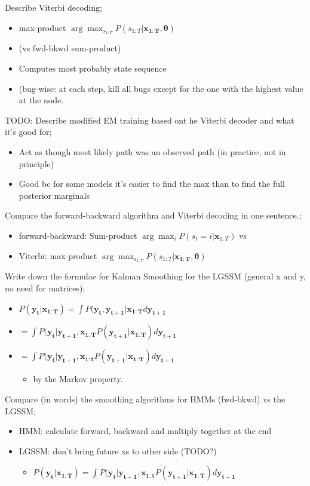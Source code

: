 \documentclass{article}
\begin{document}
Describe Viterbi decoding; \begin{itemize} \item max-product $\arg\max_{s_{1:T}}P(s_{1:T}|\mathbf{x_{1:T},\theta})$  \item (vs fwd-bkwd sum-product) \item Computes most probably state sequence \item (bug-wise: at each step, kill all bugs except for the one with the highest value at the node. \end{itemize}

TODO: Describe modified EM training based ont he Viterbi decoder and what it's good for; \begin{itemize} \item Act as though most likely path was an observed path (in practice, not in principle) \item Good bc for some models it's easier to find the max than to find the full posterior marginals \end{itemize}

Compare the forward-backward algorithm and Viterbi decoding in one sentence.; \begin{itemize} \item forward-backward: Sum-product $\arg\max_{i}P(s_t=i|\mathbf{x}_{1:T})$ vs \item Viterbi: max-product $\arg\max_{s_{1:T}}P(s_{1:T}|\mathbf{x_{1:T},\theta})$ \end{itemize}

Write down the formulae for Kalman Smoothing for the LGSSM (general x and y, no need for matrices); \begin{itemize} \item $P(\mathbf{y_t|x_{1:T}})=\int P(\mathbf{y_t, y_{t+1}|x_{1:T}}d\mathbf{y_{t+1}}$ \item $=\int P(\mathbf{y_t|y_{t+1},x_{1:T}}P(\mathbf{y_{t+1}|x_{1:T}}) d\mathbf{y_{t+1}}$ \item $=\int P(\mathbf{y_t|y_{t+1},x_{1:t}}P(\mathbf{y_{t+1}|x_{1:T}}) d\mathbf{y_{t+1}}$ \begin{itemize} \item by the Markov property. \end{itemize} \end{itemize}

Compare (in words) the smoothing algorithms for HMMs (fwd-bkwd) vs the LGSSM; \begin{itemize} \item HMM: calculate forward, backward and multiply together at the end \item LGSSM: don't bring future xs to other side (TODO?) \begin{itemize} \item  $P(\mathbf{y_t|x_{1:T}})=\int P(\mathbf{y_t|y_{t+1},x_{1:t}}P(\mathbf{y_{t+1}|x_{1:T}}) d\mathbf{y_{t+1}}$ \end{itemize} \end{itemize}
\end{document}
